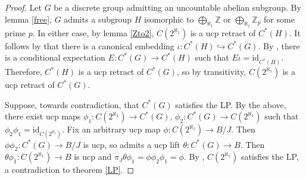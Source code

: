 \documentclass[10pt]{amsart}
\theoremstyle{definition}
\begin{document}
\begin{proof}
    Let $G$ be a discrete group admitting an uncountable abelian subgroup. By lemma \ref{free}, $G$ admits a subgroup $H$ isomorphic to $\bigoplus_{\aleph_1}\mathbb{Z}$ or $\bigoplus_{\aleph_1}\mathbb{Z}_p$ for some prime $p$. In either case, by lemma \ref{Zto2}, $C(2^{\aleph_1})$ is a ucp retract of $C^*(H)$. It follows by \cite[2.5.8]{BROZ} that there is a canonical embedding $\iota:C^*(H)\hookrightarrow C^*(G)$. By \cite[2.5.11]{BROZ}, there is a conditional expectation $E:C^*(G)\rightarrow C^*(H)$ such that $E\iota=\mathrm{id}_{C^*(H)}$. Therefore, $C^*(H)$ is a ucp retract of $C^*(G)$, so by transitivity, $C(2^{\aleph_1})$ is a ucp retract of $C^*(G)$.
    
    Suppose, towards contradiction, that $C^*(G)$ satisfies the LP. By the above, there exist ucp maps $\phi_1:C(2^{\aleph_1})\rightarrow C^*(G)$, $\phi_2: C^*(G)\rightarrow C(2^{\aleph_1})$ such that $\phi_2\phi_1=\mathrm{id}_{C(2^{\aleph_1})}$. Fix an arbitrary ucp map $\phi:C(2^{\aleph_1})\rightarrow B/J$. Then $\phi\phi_2:C^*(G)\rightarrow B/J$ is ucp, so admits a ucp lift $\theta: C^*(G)\rightarrow B$. Then $\theta\phi_1:C(2^{\aleph_1})\rightarrow B$ is ucp and $\pi_J \theta\phi_1=\phi\phi_2\phi_1=\phi$. By \cite[13.1.2]{BROZ}, $C(2^{\aleph_1})$ satisfies the LP, a contradiction to theorem \ref{LP}.
\end{proof}
\end{document}
